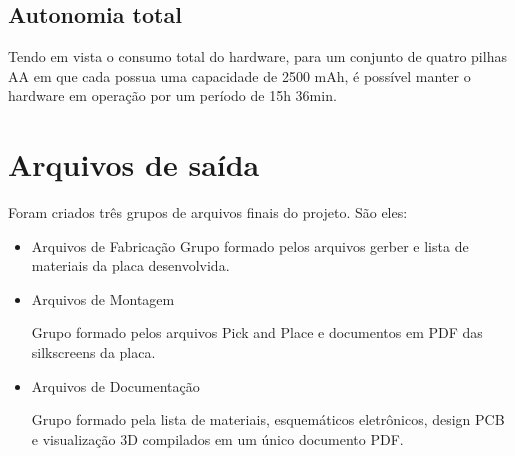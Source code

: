 	\begin{table}[!h]
	\captionsetup{width=7cm}%
    \end{table}

\newpage
\subsection{Autonomia total}

Tendo em vista o consumo total do hardware, para um conjunto de quatro pilhas AA em que cada possua uma capacidade de 2500 mAh, é possível manter o hardware em operação por um período de 15h 36min. 


\section{Arquivos de saída}

Foram criados três grupos de arquivos finais do projeto. São eles: 

\begin{itemize}
    \item Arquivos de Fabricação
    Grupo formado pelos arquivos gerber e lista de materiais da placa desenvolvida.
    
    
    
    \item Arquivos de Montagem
    
    Grupo formado pelos arquivos Pick and Place e documentos em PDF das silkscreens da placa.
    
    
    \item Arquivos de Documentação
    
    
    Grupo formado pela lista de materiais, esquemáticos eletrônicos, design PCB e visualização 3D compilados em um único documento PDF.
    

\end{itemize}





